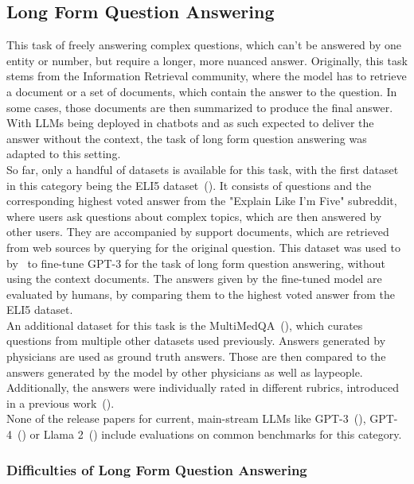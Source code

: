 \subsection{Long Form Question Answering}\label{sec:long-form-qa}
This task of freely answering complex questions, which can't be answered by one entity or number, but require a longer, more nuanced answer.
Originally, this task stems from the Information Retrieval community, where the model has to retrieve a document or a set of documents, which contain the answer to the question.
In some cases, those documents are then summarized to produce the final answer.
With LLMs being deployed in chatbots and as such expected to deliver the answer without the context, the task of long form question answering was adapted to this setting.
\\
So far, only a handful of datasets is available for this task, with the first dataset in this category being the ELI5 dataset~(\cite{fan:2019}).
It consists of questions and the corresponding highest voted answer from the "Explain Like I'm Five" subreddit, where users ask questions about complex topics, which are then answered by other users.
They are accompanied by support documents, which are retrieved from web sources by querying for the original question.
This dataset was used to by~\cite{nakano:2021} to fine-tune GPT-3 for the task of long form question answering, without using the context documents.
The answers given by the fine-tuned model are evaluated by humans, by comparing them to the highest voted answer from the ELI5 dataset.
\\ 
An additional dataset for this task is the MultiMedQA~(\cite{singhal:2023}), which curates questions from multiple other datasets used previously. 
Answers generated by physicians are used as ground truth answers.
Those are then compared to the answers generated by the model by other physicians as well as laypeople.
Additionally, the answers were individually rated in different rubrics, introduced in a previous work~(\cite{singhal:2022}).
\\
None of the release papers for current, main-stream LLMs like GPT-3~(\cite{brown:2020}), GPT-4~(\cite{openai:2023}) or Llama 2~(\cite{touvron:2023}) include evaluations on common benchmarks for this category.

\subsubsection{Difficulties of Long Form Question Answering}\label{sec:long-form-qa-difficulties}

